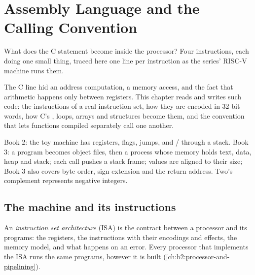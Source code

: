 \chapter{Assembly Language and the Calling Convention}\label{ch:b2:assembly-and-calling-convention}

What does the C statement  become inside the processor? Four instructions, each doing one small
thing, traced here one line per instruction as the series' RISC-V machine runs them.

\label{lst:b2:assembly-and-calling-convention:hook}

\label{out:b2:assembly-and-calling-convention:hook}

The C line hid an address computation, a memory access, and the fact that arithmetic happens only between
registers. This chapter reads and writes such code: the instructions of a real instruction set, how they are
encoded in 32-bit words, how C's , loops, arrays and structures become them, and the convention that lets
functions compiled separately call one another.

\begin{recall}
Book 2: the toy machine has registers, flags, jumps, and / through a stack. Book 3: a program
becomes object files, then a process whose memory holds text, data, heap and stack; each call pushes a stack frame;
values are aligned to their size; Book 3 also covers byte order, sign extension and the return address. Two's
complement represents negative integers.
\end{recall}

\section{The machine and its instructions}\label{sec:b2:assembly-and-calling-convention:isa}

\begin{definition}\label{def:b2:assembly-and-calling-convention:isa}
An \emph{instruction set architecture} (ISA) is the contract between a processor
and its programs: the registers, the instructions with their encodings and effects, the memory model, and what
happens on an error. Every processor that implements the ISA runs the same programs, however it is built
(\cref{ch:b2:processor-and-pipelining}).
\end{definition}

